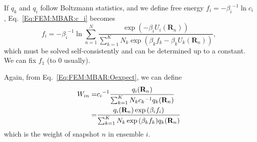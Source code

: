 If $q_k$ and $q_i$ follow Boltzmann statistics, and we define free energy $f_i=-{\beta_i}^{-1}\ln{c_i}$, Eq.~\ref{Eq:FEM:MBAR:c_i} becomes
\begin{equation}
f_i=-{\beta_i}^{-1}\ln{\sum\limits_{n=1}^N \frac{\exp{\left(-\beta_i U_i(\mathbf{R}_n)\right)}}{\sum_{k=1}^{K}N_k\exp{\left(\beta_kf_k-\beta_kU_k(\mathbf{R}_n)\right)}}},
\label{Eq:FEM:MBAR:f_i_final}
\end{equation}
which must be solved self-consistently and can be determined up to a constant. We can fix $f_1$ (to 0 usually). 

Again, from Eq.~\ref{Eq:FEM:MBAR:Oexpect}, we can define
\begin{align}
W_{in}=&{c_i}^{-1}\frac{q_i(\mathbf{R}_n)}{\sum_{k=1}^{K}N_k{c_k}^{-1}q_k(\mathbf{R}_n)}\notag\\
      =&\frac{q_i(\mathbf{R}_n)\exp{\left(\beta_i f_i\right)}}{\sum_{k=1}^{K}N_k\exp{\left(\beta_k f_k\right)}q_k(\mathbf{R}_n)}
\end{align}
which is the weight of snapshot $n$ in ensemble $i$.

